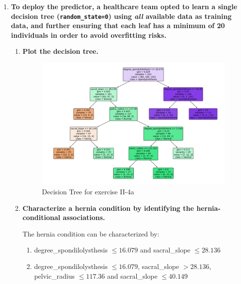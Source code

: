 \documentclass[12pt]{article}
\begin{document}
\begin{enumerate}[leftmargin=\labelsep]
  \item \textbf{To deploy the predictor, a healthcare team opted to learn a single decision tree
          (\texttt{random\_state=0}) using \textit{all} available data as training data, and further ensuring that each leaf has
          a minimum of 20 individuals in order to avoid overfitting risks.}
        \begin{enumerate}
          \item \textbf{Plot the decision tree.}

                \vskip 0.3cm
                

                \begin{figure}[H]
                  \centering
                  \includegraphics[width=\linewidth]{./assets/decision_tree_ex4a_PartII.png}
                  \caption{Decision Tree for exercise II-4a}
                  \label{fig:PartII-ex4a-plot}
                \end{figure}

          \item \textbf{Characterize a hernia condition by identifying the hernia-conditional associations.}

                \vskip 0.3cm

                The hernia condition can be characterized by:
                \begin{enumerate}
                  \item degree\_spondilolysthesis $\leq 16.079$ and sacral\_slope $\leq 28.136$
                  \item degree\_spondilolysthesis $\leq 16.079$, sacral\_slope $> 28.136$, pelvic\_radius $\leq 117.36$ and sacral\_slope $\leq 40.149$
                \end{enumerate}
        \end{enumerate}
\end{enumerate}
\end{document}
